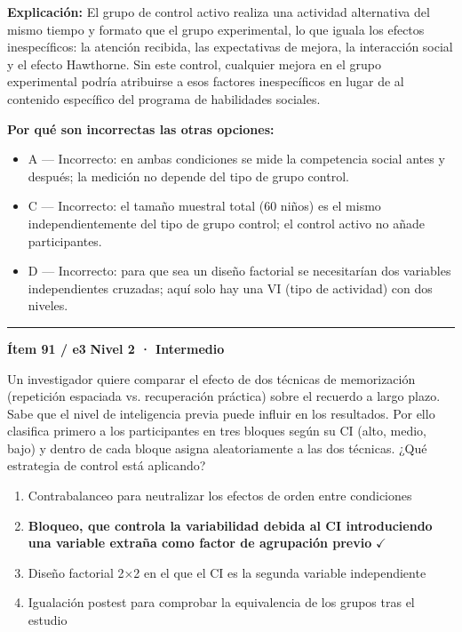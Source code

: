 \documentclass[12pt,a4paper]{article}
\begin{document}
\noindent\textbf{\color{azul}Explicación:} El grupo de control activo realiza una actividad alternativa del mismo tiempo y formato que el grupo experimental, lo que iguala los efectos inespecíficos: la atención recibida, las expectativas de mejora, la interacción social y el efecto Hawthorne. Sin este control, cualquier mejora en el grupo experimental podría atribuirse a esos factores inespecíficos en lugar de al contenido específico del programa de habilidades sociales.

\noindent\textbf{\color{gris}Por qué son incorrectas las otras opciones:}
\begin{itemize}
  \item {\small A — Incorrecto: en ambas condiciones se mide la competencia social antes y después; la medición no depende del tipo de grupo control.}
  \item {\small C — Incorrecto: el tamaño muestral total (60 niños) es el mismo independientemente del tipo de grupo control; el control activo no añade participantes.}
  \item {\small D — Incorrecto: para que sea un diseño factorial se necesitarían dos variables independientes cruzadas; aquí solo hay una VI (tipo de actividad) con dos niveles.}
\end{itemize}
\vspace{8pt}\hrule\vspace{10pt}

\begin{mdframed}[backgroundcolor=fondogris,linecolor=ambar,linewidth=1pt,innerleftmargin=10pt,innerrightmargin=10pt,innertopmargin=7pt,innerbottommargin=7pt]
\textbf{Ítem 91 / e3} \hfill {\small\bfseries\color{ambar} Nivel 2 · Intermedio}
\end{mdframed}

Un investigador quiere comparar el efecto de dos técnicas de memorización (repetición espaciada vs. recuperación práctica) sobre el recuerdo a largo plazo. Sabe que el nivel de inteligencia previa puede influir en los resultados. Por ello clasifica primero a los participantes en tres bloques según su CI (alto, medio, bajo) y dentro de cada bloque asigna aleatoriamente a las dos técnicas. ¿Qué estrategia de control está aplicando?

\begin{enumerate}
  \item[A.] Contrabalanceo para neutralizar los efectos de orden entre condiciones
  \item[\textbf{\color{verde}B.}] \textbf{\color{verde} Bloqueo, que controla la variabilidad debida al CI introduciendo una variable extraña como factor de agrupación previo} \hfill $\checkmark$
  \item[C.] Diseño factorial 2×2 en el que el CI es la segunda variable independiente
  \item[D.] Igualación postest para comprobar la equivalencia de los grupos tras el estudio
\end{enumerate}
\end{document}

